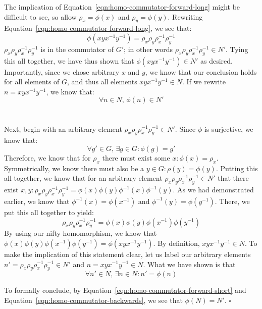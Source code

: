 \documentclass[letterpaper]{article}
\newcommand*{\QED}{\hfill\ensuremath{\square}}%
\begin{document}
The implication of Equation~\ref{eqn:homo-commutator-forward-long} might be difficult to see, so allow $ \rho_x = \phi(x) $ and $ \rho_y = \phi(y) $.
Rewriting Equation~\ref{eqn:homo-commutator-forward-long}, we see that:
\[
\phi \left(xyx^{-1}y^{-1} \right) = \rho_x \rho_y \rho^{-1}_x \rho^{-1}_y
\]
$ \rho_x \rho_y \rho^{-1}_x \rho^{-1}_y $ is in the commutator of $ G' $; in other words $ \rho_x \rho_y \rho^{-1}_x \rho^{-1}_y \in N' $.
Tying this all together, we have thus shown that $ \phi \left(xyx^{-1}y^{-1} \right) \in N' $ as desired.
Importantly, since we chose arbitrary $ x $ and $ y $, we know that our conclusion holds for all elements of $ G $, and thus all elements $ xyx^{-1}y^{-1} \in N $.
If we rewrite $ n = xyx^{-1}y^{-1} $, we know that:
\begin{equation}
    \label{eqn:homo-commutator-forward-short}
\forall n \in N, \, \phi(n) \in N'
\end{equation}
\\ \\
Next, begin with an arbitrary element $ \rho_x \rho_y \rho^{-1}_x \rho^{-1}_y \in N' $.
Since $ \phi $ is surjective, we know that:
\[
\forall g' \in G, \, \exists g \in G : \phi(g) = g'
\]
Therefore, we know that for $ \rho_x $ there must exist some $ x : \phi(x) = \rho_x $.
Symmetrically, we know there must also be a $ y \in G : \rho(y) = \phi(y) $.
Putting this all together, we know that for an arbitrary element $ \rho_x \rho_y \rho^{-1}_x \rho^{-1}_y \in N' $ that there exist $ x, y : \rho_x \rho_y \rho^{-1}_x \rho^{-1}_y = \phi(x) \phi(y) \phi^{-1}(x) \phi^{-1}(y) $.
As we had demonstrated earlier, we know that $ \phi^{-1} (x) = \phi(x^{-1}) $ and $ \phi^{-1} (y) = \phi(y^{-1}) $.
There, we put this all together to yield:
\[
\rho_x \rho_y \rho^{-1}_x \rho^{-1}_y = \phi(x) \phi(y) \phi(x^{-1}) \phi(y^{-1})
\]
By using our nifty homomorphism, we know that $ \phi(x) \phi(y) \phi(x^{-1}) \phi(y^{-1}) = \phi \left(xyx^{-1}y^{-1} \right) $.
By definition, $ xyx^{-1}y^{-1} \in N $.
To make the implication of this statement clear, let us label our arbitrary elements $ n' = \rho_x \rho_y \rho^{-1}_x \rho^{-1}_y \in N' $ and $ n = xyx^{-1}y^{-1} \in N $.
What we have shown is that
\begin{equation}
    \label{eqn:homo-commutator-backwards}
\forall n' \in N, \, \exists n \in N : n' = \phi(n)
\end{equation}

To formally conclude, by Equation~\ref{eqn:homo-commutator-forward-short} and Equation~\ref{eqn:homo-commutator-backwards}, we see that $ \phi(N) = N' $.
\QED{}
\end{document}
